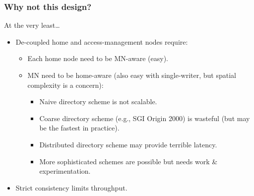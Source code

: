 \documentclass{beamer}
\begin{document}
\begin{frame}
    \frametitle{Why not this design?}
    At the very least\dots
    \begin{itemize}
        \item {
            De-coupled home and access-management nodes require:
            \begin{itemize}
                \item Each home node need to be MN-aware (easy).
                \item {
                    MN need to be home-aware (also easy with single-writer, but spatial complexity is a concern):
                    \begin{itemize}
                        \item Naive directory scheme is not scalable.
                        \item Coarse directory scheme (e.g., SGI Origin 2000) is wasteful (but may be the fastest in practice).
                        \item Distributed directory scheme may provide terrible latency.
                        \item More sophisticated schemes are possible but needs work \& experimentation.
                    \end{itemize}
                }
            \end{itemize}
        }
        \item {
            Strict consistency limits throughput.
        }
    \end{itemize}
\end{frame}
\end{document}
